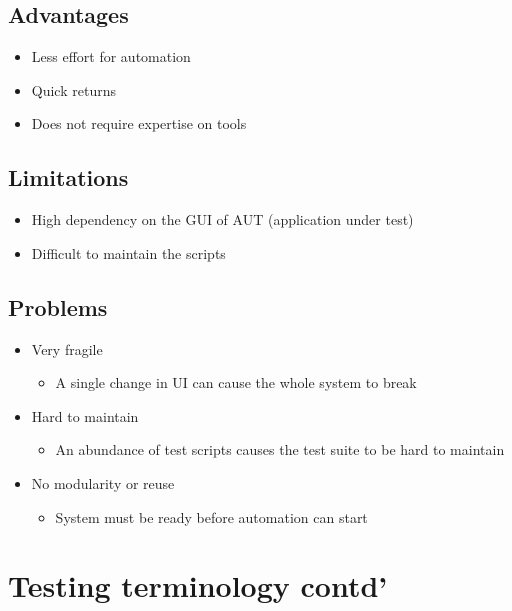 \documentclass[12pt]{book}
\begin{document}
\subsection{Advantages}
\begin{itemize}
    \item Less effort for automation
    \item Quick returns
    \item Does not require expertise on tools
\end{itemize}

\subsection{Limitations}
\begin{itemize}
    \item High dependency on the GUI of AUT (application under test)
    \item Difficult to maintain the scripts
\end{itemize}

\subsection{Problems}

\begin{itemize}
    \item Very fragile
    \begin{itemize}
        \item A single change in UI can cause the whole system to break
    \end{itemize} 
    \item Hard to maintain
    \begin{itemize}
        \item An abundance of test scripts causes the test suite to be hard to maintain
    \end{itemize} 
    \item No modularity or reuse
    \begin{itemize}
        \item System must be ready before automation can start
    \end{itemize} 
\end{itemize}

\section{Testing terminology contd'}
\end{document}
